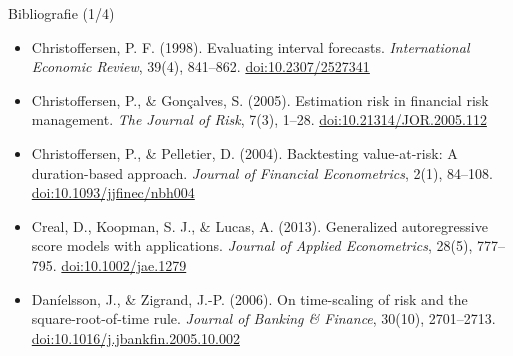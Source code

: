 \begin{frame}{Bibliografie (1/4)}
\begin{itemize}
    \item Christoffersen, P. F. (1998). Evaluating interval forecasts. \textit{International Economic Review}, 39(4), 841--862. \href{https://doi.org/10.2307/2527341}{doi:10.2307/2527341}
    \item Christoffersen, P., \& Gonçalves, S. (2005). Estimation risk in financial risk management. \textit{The Journal of Risk}, 7(3), 1--28. \href{https://doi.org/10.21314/JOR.2005.112}{doi:10.21314/JOR.2005.112}
    \item Christoffersen, P., \& Pelletier, D. (2004). Backtesting value-at-risk: A duration-based approach. \textit{Journal of Financial Econometrics}, 2(1), 84--108. \href{https://doi.org/10.1093/jjfinec/nbh004}{doi:10.1093/jjfinec/nbh004}
    \item Creal, D., Koopman, S. J., \& Lucas, A. (2013). Generalized autoregressive score models with applications. \textit{Journal of Applied Econometrics}, 28(5), 777--795. \href{https://doi.org/10.1002/jae.1279}{doi:10.1002/jae.1279}
    \item Daníelsson, J., \& Zigrand, J.-P. (2006). On time-scaling of risk and the square-root-of-time rule. \textit{Journal of Banking \& Finance}, 30(10), 2701--2713. \href{https://doi.org/10.1016/j.jbankfin.2005.10.002}{doi:10.1016/j.jbankfin.2005.10.002}
\end{itemize}
\end{frame}

